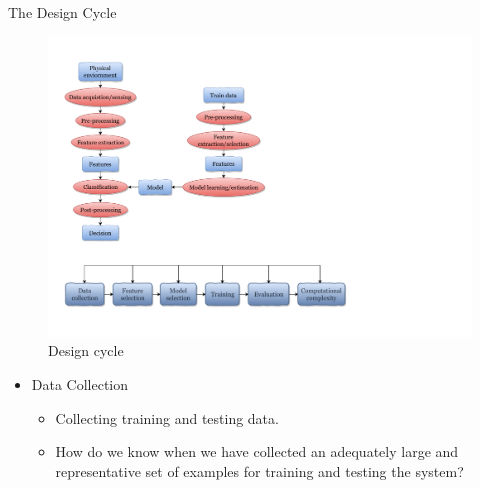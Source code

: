 \begin{frame}{The Design Cycle}
\begin{figure}
\includegraphics[width=\textwidth]{Figures/DesignCycle}
\caption{Design cycle}
\end{figure}
\begin{itemize}
\item {\color{mycolor2}Data Collection}
\begin{itemize}
\item Collecting training and testing data.
\item How do we know when we have collected an adequately large and representative set of examples for training and testing the system?
\end{itemize}
\end{itemize}
\vspace{2cm}
\end{frame}

